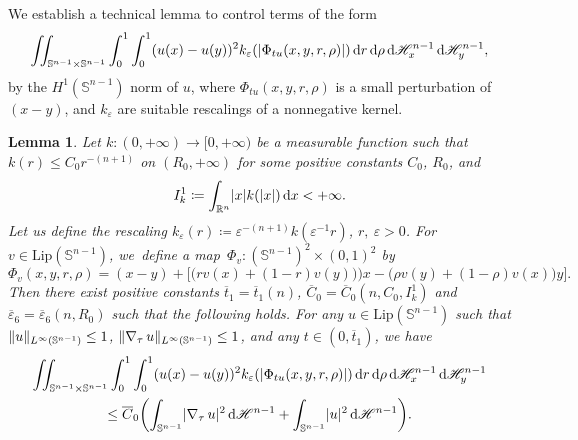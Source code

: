 \documentclass[JEP,XML,SOM,Unicode,published]{cedram}
\numberwithin{equation}{section}
\theoremstyle{plain}
\newtheorem{lem}[thm]{Lemma}
\theoremstyle{definition}
\newcommand{\numberset}[1]{{\mathbb{#1}}}
\newcommand{\R}{\numberset{R}}
\newcommand{\dd}{\mathop{}\mathopen{}\mathrm{d}}
\newcommand{\dx}{\mathop{}\mathopen{}\mathrm{d}x}
\newcommand{\dr}{\mathop{}\mathopen{}\mathrm{d}r}
\newcommand{\dH}{\mathop{}\mathopen{}\mathrm{d}\mathscr{H}}
\newcommand{\bbS}{\mathbb{S}}
\let\eps\varepsilon
\let\ol\overline
\newcommand{\Ren}{{\R^n}}
\newcommand{\Lip}{{\mathrm{Lip}}}
\newcommand{\grad}{\nabla}
\DeclarePairedDelimiter{\abs}{\lvert}{\rvert}
\DeclarePairedDelimiter{\norm}{\lVert}{\rVert}
\begin{document}
We establish a technical lemma to control terms of the form
\[
\iint_{\bbS^{n-1}\times\bbS^{n-1}} \int_0^1\int_0^1 (u(x)-u(y))^2
k_\eps(\abs{\Phi_{tu}(x,y,r,\rho)})\dr\dd\rho\dH^{n-1}_x\dH^{n-1}_y,
\]
by the $H^1(\bbS^{n-1})$ norm of $u$, where $\Phi_{tu}(x,y,r,\rho)$ is a small perturbation of
$(x-y)$, and $k_\eps$ are suitable rescalings of a nonnegative kernel.

\begin{lem}\label{lem:techlem1}
Let $k:(0,+\infty)\to[0,+\infty)$ be a measurable function such that $k(r)\leq C_0 r^{-(n+1)}$
on $(R_0,+\infty)$ for some positive constants $C_0$, $R_0$, and
\[
I_k^1 \coloneqq \int_{\Ren} \abs{x}k(\abs{x})\dx <+\infty.
\]
Let us define the rescaling $k_\eps(r)\coloneqq \eps^{-(n+1)}k(\eps^{-1}r)$, $r,~\eps>0$.
For $v\in\Lip(\bbS^{n-1})$, we~define a map~$\Phi_v:\left(\bbS^{n-1}\right)^2\times (0,1)^2$ by
\begin{equation}\label{eq:defPhi}
\Phi_v(x,y,r,\rho)=(x-y)+\Big[\big(rv(x)+(1-r)v(y))\big)x-\big(\rho v(y)+(1-\rho)v(x)\big)y\Big].
\end{equation}
Then there exist positive constants $\ol{t}_1=\ol{t}_1(n)$,
$\ol{C}_0=\ol{C}_0(n,C_0,I_k^1)$ and $\ol{\eps}_6=\ol{\eps}_6(n,R_0)$ such that the
following holds.
For any $u\in\Lip(\bbS^{n-1})$ such that $\norm{u}_{L^\infty(\bbS^{n-1})}\leq 1$,
$\norm{\grad_\tau\, u}_{L^\infty(\bbS^{n-1})}\leq 1$, and any $t\in(0,\ol{t}_1)$, we have\enlargethispage{3pt}%
\begin{multline}\label{techlem1:skernel}
\iint_{\bbS^{n-1}\times\bbS^{n-1}} \int_0^1\int_0^1 (u(x)-u(y))^2
k_\eps(\abs{\Phi_{tu}(x,y,r,\rho)})\dr\dd\rho\dH^{n-1}_x\dH^{n-1}_y\\
\leq \ol{C}_0\biggl(\int_{\bbS^{n-1}} \abs{\grad_\tau\, u}^2\dH^{n-1}+\int_{\bbS^{n-1}}
\abs{u}^2\dH^{n-1} \biggr).
\end{multline}
\end{lem}
\end{document}
